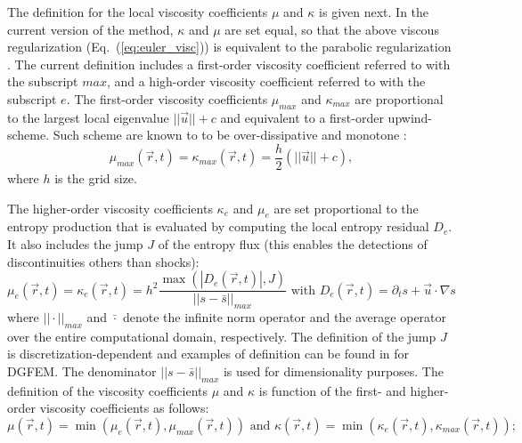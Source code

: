 \documentclass[12pt]{article}
\newcommand{\eqt}[1]{Eq.~(\ref{#1})} %
\begin{document}
The definition for the local viscosity coefficients $\mu$ and $\kappa$ is given next. In the current version of the method, $\kappa$ and $\mu$ are set equal, so that the above viscous regularization (\eqt{eq:euler_visc}) is equivalent to the parabolic regularization \cite{Parabolic}. The current definition includes a first-order viscosity coefficient referred to with the subscript $max$, and a high-order viscosity coefficient referred to with the subscript $e$. The first-order viscosity coefficients $\mu_{max}$ and $\kappa_{max}$ are proportional to the largest local eigenvalue $|| \vec{u} || + c $ and equivalent to a first-order upwind-scheme. Such scheme are known to to be over-dissipative and monotone \cite{Toro}: 
\begin{equation}
\label{eq:equation15}
\mu_{max}(\vec{r}, t) = \kappa_{max}(\vec{r}, t) = \frac{h}{2} \left( || \vec{u} || + c \right),
\end{equation}
where $h$ is the grid size. 

The higher-order viscosity coefficients $\kappa_e$ and $\mu_e$ are set proportional to the entropy production that is evaluated by computing the local entropy residual $D_e$. It also includes the jump $J$ of the entropy flux (this enables the detections of discontinuities others than shocks):
\begin{equation}
\label{eq:ent_visc_coeff}
\mu_e(\vec{r},t) = \kappa_e(\vec{r},t) = h^2 \frac{\max\left( | D_e(\vec{r},t) |, J \right)}{|| s - \bar{s} ||_{max}} \text{ with } D_e(\vec{r}, t) = \partial_t s + \vec{u} \cdot \nabla s
\end{equation}
where $|| \cdot ||_{max}$ and $\bar{\cdot}$ denote the infinite norm operator and the average operator over the entire computational domain, respectively. The definition of the jump $J$ is discretization-dependent and examples of definition can be found in \cite{valentin} for DGFEM. The denominator $|| s - \bar{s} ||_{max}$ is used for dimensionality purposes.
The definition of the viscosity coefficients $\mu$ and $\kappa$ is function of the first- and higher-order viscosity coefficients as follows:
\begin{equation}
\label{eq:mu}
\mu(\vec{r},t) = \min\left( \mu_e(\vec{r},t), \mu_{max}(\vec{r},t) \right) \text{ and } \kappa(\vec{r},t) = \min\left( \kappa_e(\vec{r},t), \kappa_{max}(\vec{r},t) \right);
\end{equation}
\end{document}
